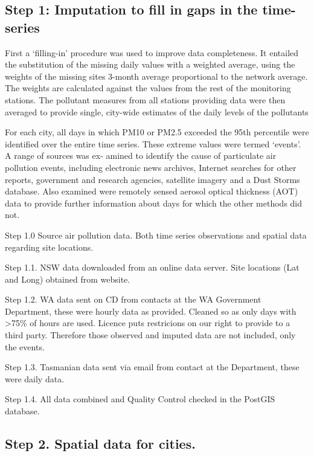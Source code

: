 \subsection{Step 1: Imputation to fill in gaps in the
time-series}\label{step-1-imputation-to-fill-in-gaps-in-the-time-series}

First a `filling-in' procedure was used to improve data completeness. It
entailed the substitution of the missing daily values with a weighted
average, using the weights of the missing sites 3-month average
proportional to the network average. The weights are calculated against
the values from the rest of the monitoring stations. The pollutant
measures from all stations providing data were then averaged to provide
single, city-wide estimates of the daily levels of the pollutants

For each city, all days in which PM10 or PM2.5 exceeded the 95th
percentile were identified over the entire time series. These extreme
values were termed `events'. A range of sources was ex- amined to
identify the cause of particulate air pollution events, including
electronic news archives, Internet searches for other reports,
government and research agencies, satellite imagery and a Dust Storms
database. Also examined were remotely sensed aerosol optical thickness
(AOT) data to provide further information about days for which the other
methods did not.

Step 1.0 Source air pollution data. Both time series observations and
spatial data regarding site locations.

Step 1.1. NSW data downloaded from an online data server. Site locations
(Lat and Long) obtained from website.

Step 1.2. WA data sent on CD from contacts at the WA Government
Department, these were hourly data as provided. Cleaned so as only days
with \textgreater{}75\% of hours are used. Licence puts restricions on
our right to provide to a third party. Therefore those observed and
imputed data are not included, only the events.

Step 1.3. Tasmanian data sent via email from contact at the Department,
these were daily data.

Step 1.4. All data combined and Quality Control checked in the PostGIS
database.

\subsection{Step 2. Spatial data for
cities.}\label{step-2.-spatial-data-for-cities.}


